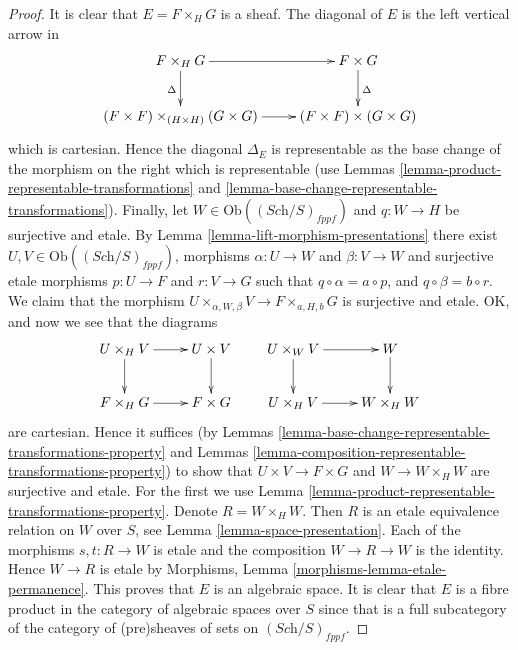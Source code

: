 \begin{proof}
It is clear that $E = F \times_H G$ is a sheaf.
The diagonal of $E$ is the left vertical arrow in
$$
\xymatrix{
F \times_H G \ar[r] \ar[d]_\Delta &
F \times G \ar[d]^\Delta \\
(F \times F) \times_{(H \times H)} (G \times G) \ar[r] &
(F \times F) \times (G \times G)
}
$$
which is cartesian. Hence the diagonal $\Delta_E$ is
representable as the base change of the morphism
on the right which is representable (use Lemmas
\ref{lemma-product-representable-transformations} and
\ref{lemma-base-change-representable-transformations}).
Finally, let $W \in \text{Ob}((\textit{Sch}/S)_{fppf})$
and $q : W \to H$ be surjective and etale.
By Lemma \ref{lemma-lift-morphism-presentations} there exist
$U, V \in \text{Ob}((\textit{Sch}/S)_{fppf})$,
morphisms $\alpha : U \to W$ and $\beta : V \to W$
and surjective etale morphisms $p : U \to F$ and $r : V \to G$
such that $q \circ \alpha = a \circ p$, and
$q \circ \beta = b \circ r$.
We claim that the morphism
$U \times_{\alpha, W, \beta} V \to F \times_{a, H, b} G$
is surjective and etale. OK, and now we see that the diagrams
$$
\xymatrix{
U \times_H V \ar[r] \ar[d] &
U \times V
\ar[d] \\
F \times_H G
\ar[r] &
F \times G
}
\quad
\quad
\xymatrix{
U \times_W V \ar[r] \ar[d] &
W \ar[d] \\
U \times_H V \ar[r] &
W \times_H W
}
$$
are cartesian. Hence it suffices (by
Lemmas \ref{lemma-base-change-representable-transformations-property} and
Lemmas \ref{lemma-composition-representable-transformations-property})
to show that $U \times V \to F \times G$ and
$W \to W \times_H W$ are surjective and etale. For the first we use
Lemma \ref{lemma-product-representable-transformations-property}.
Denote $R = W \times_H W$. Then $R$ is an etale equivalence relation
on $W$ over $S$, see Lemma \ref{lemma-space-presentation}.
Each of the morphisms $s, t : R \to W$ is etale and the
composition $W \to R \to W$ is the identity. Hence $W \to R$
is etale by Morphisms, Lemma \ref{morphisms-lemma-etale-permanence}.
This proves that $E$ is an algebraic space.
It is clear that $E$ is a fibre product in the category of algebraic
spaces over $S$ since that is a full subcategory of the category
of (pre)sheaves of sets on $(\textit{Sch}/S)_{fppf}$.
\end{proof}











